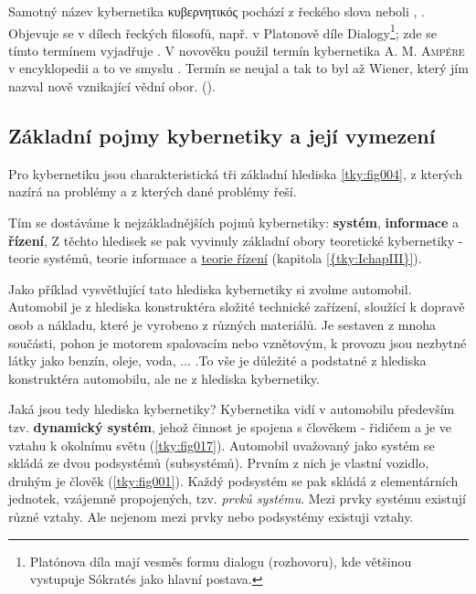     Samotný název kybernetika \foreignlanguage{greek}{κυβερνητικός} pochází z řeckého slova
     neboli , . Objevuje se v dílech řeckých
    filosofů, např. v Platonově díle Dialogy\footnote{Platónova díla mají vesměs formu dialogu
    (rozhovoru), kde většinou vystupuje Sókratés jako hlavní postava.}; zde se tímto termínem
    vyjadřuje . V novověku použil termín
    kybernetika \textsc{A. M. Ampére} v encyklopedii a to ve smyslu .
    Termín se neujal a tak to byl až Wiener, který jím nazval nově vznikající vědní obor.
    (\cite[s.~6]{Svarc1986}).

    \subsection{Základní pojmy kybernetiky a její vymezení}
      Pro kybernetiku jsou charakteristická tři základní hlediska \ref{tky:fig004}, z kterých nazírá
      na problémy a z kterých dané problémy řeší.

      
      Tím se dostáváme k nejzákladnějších pojmů kybernetiky: \textbf{systém}, \textbf{informace} a
      \textbf{řízení}, Z těchto hledisek se pak vyvinuly základní obory teoretické kybernetiky -
      teorie systémů, teorie informace a \hyperlink{tky:regulace}{teorie řízení} (kapitola
      \ref{{tky:IchapIII}}).
      
      Jako příklad vysvětlující tato hlediska kybernetiky si zvolme automobil. Automobil je z 
      hlediska konstruktéra složité technické zařízení, sloužící k dopravě osob a nákladu, které je 
      vyrobeno z různých materiálů. Je sestaven z mnoha součásti, pohon je motorem spalovacím nebo 
      vznětovým, k provozu jsou nezbytné látky jako benzín, oleje, voda, ... .To vše je důležité a 
      podstatné z hlediska konstruktéra automobilu, ale ne z hlediska kybernetiky.


      Jaká jsou tedy hlediska kybernetiky? Kybernetika vidí v automobilu především tzv.
      \textbf{dynamický systém}, jehož činnost je spojena s člověkem - řidičem a je ve vztahu k
      okolnímu světu (\ref{tky:fig017}). Automobil uvažovaný jako systém se skládá ze dvou
      podsystémů (subsystémů). Prvním z nich je vlastní vozidlo, druhým je člověk
      (\ref{tky:fig001}). Každý podsystém se pak skládá z elementárních jednotek, vzájemně
      propojených, tzv. \emph{prvků systému}. Mezi prvky systému existují různé vztahy. Ale nejenom
      mezi prvky nebo podsystémy existuji vztahy.

